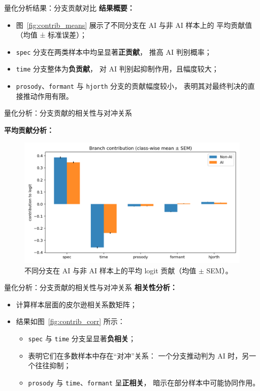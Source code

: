 \documentclass[aspectratio=169]{beamer}
\begin{document}
\begin{frame}{量化分析结果：分支贡献对比}
\textbf{结果概要：}
\begin{itemize}
  \item 图~\ref{fig:contrib_means} 展示了不同分支在 AI 与非 AI 样本上的
        平均贡献值（均值 ± 标准误差）；
  \item \texttt{spec} 分支在两类样本中均呈显著\textbf{正贡献}，
        推高 AI 判别概率；
  \item \texttt{time} 分支整体为\textbf{负贡献}，
        对 AI 判别起抑制作用，且幅度较大；
  \item \texttt{prosody}、\texttt{formant} 与 \texttt{hjorth} 分支的贡献幅度较小，
        表明其对最终判决的直接推动作用有限。
\end{itemize}

\end{frame}

\begin{frame}{量化分析：分支贡献的相关性与对冲关系}

\textbf{平均贡献分析：}
\begin{figure}
  \centering
  \includegraphics[width=0.75\linewidth]{images_in_paper/contrib_means_by_class.png}
  \caption{不同分支在 AI 与非 AI 样本上的平均 logit 贡献（均值 $\pm$ SEM）。}
  \label{fig:contrib_means_by_class}
\end{figure}
\end{frame}

\begin{frame}{量化分析：分支贡献的相关性与对冲关系}
\textbf{相关性分析：}
\begin{itemize}
  \item 计算样本层面的皮尔逊相关系数矩阵；
  \item 结果如图~\ref{fig:contrib_corr} 所示：
    \begin{itemize}
      \item \texttt{spec} 与 \texttt{time} 分支呈显著\textbf{负相关}；
      \item 表明它们在多数样本中存在“对冲”关系：
        一个分支推动判为 AI 时，另一个往往抑制；
      \item \texttt{prosody} 与 \texttt{time}、\texttt{formant} 呈\textbf{正相关}，
        暗示在部分样本中可能协同作用。
    \end{itemize}
\end{itemize}

\end{frame}
\end{document}
